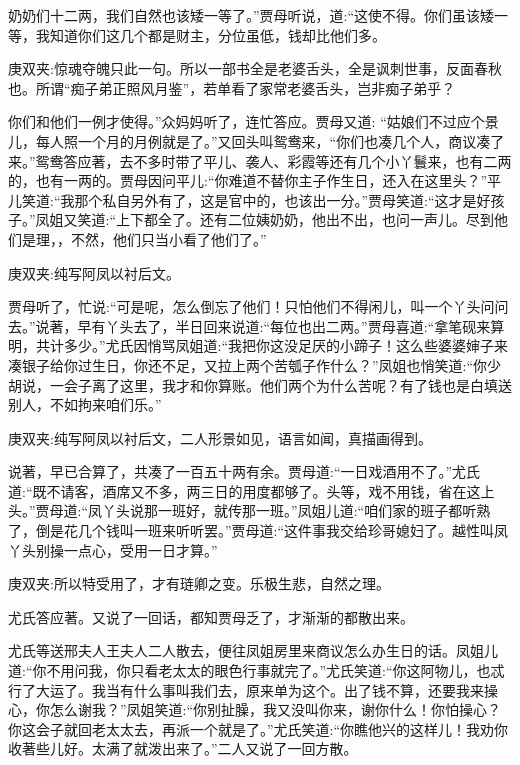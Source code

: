 \begin{parag}
奶奶们十二两，我们自然也该矮一等了。”贾母听说，道:“这使不得。你们虽该矮一等，我知道你们这几个都是财主，分位虽低，钱却比他们多。\begin{note}庚双夹:惊魂夺魄只此一句。所以一部书全是老婆舌头，全是讽刺世事，反面春秋也。所谓“痴子弟正照风月鉴”，若单看了家常老婆舌头，岂非痴子弟乎？\end{note}你们和他们一例才使得。”众妈妈听了，连忙答应。贾母又道: “姑娘们不过应个景儿，每人照一个月的月例就是了。”又回头叫鸳鸯来，“你们也凑几个人，商议凑了来。”鸳鸯答应著，去不多时带了平儿、袭人、彩霞等还有几个小丫鬟来，也有二两的，也有一两的。贾母因问平儿:“你难道不替你主子作生日，还入在这里头？”平儿笑道:“我那个私自另外有了，这是官中的，也该出一分。”贾母笑道:“这才是好孩子。”凤姐又笑道:“上下都全了。还有二位姨奶奶，他出不出，也问一声儿。尽到他们是理，，不然，他们只当小看了他们了。”\begin{note}庚双夹:纯写阿凤以衬后文。\end{note}贾母听了，忙说:“可是呢，怎么倒忘了他们！只怕他们不得闲儿，叫一个丫头问问去。”说著，早有丫头去了，半日回来说道:“每位也出二两。”贾母喜道:“拿笔砚来算明，共计多少。”尤氏因悄骂凤姐道:“我把你这没足厌的小蹄子！这么些婆婆婶子来凑银子给你过生日，你还不足，又拉上两个苦瓠子作什么？”凤姐也悄笑道:“你少胡说，一会子离了这里，我才和你算账。他们两个为什么苦呢？有了钱也是白填送别人，不如拘来咱们乐。”\begin{note}庚双夹:纯写阿凤以衬后文，二人形景如见，语言如闻，真描画得到。\end{note}
\end{parag}


\begin{parag}
    说著，早已合算了，共凑了一百五十两有余。贾母道:“一日戏酒用不了。”尤氏道:“既不请客，酒席又不多，两三日的用度都够了。头等，戏不用钱，省在这上头。”贾母道:“凤丫头说那一班好，就传那一班。”凤姐儿道:“咱们家的班子都听熟了，倒是花几个钱叫一班来听听罢。”贾母道:“这件事我交给珍哥媳妇了。越性叫凤丫头别操一点心，受用一日才算。”\begin{note}庚双夹:所以特受用了，才有琏卿之变。乐极生悲，自然之理。\end{note}尤氏答应著。又说了一回话，都知贾母乏了，才渐渐的都散出来。
\end{parag}


\begin{parag}
    尤氏等送邢夫人王夫人二人散去，便往凤姐房里来商议怎么办生日的话。凤姐儿道:“你不用问我，你只看老太太的眼色行事就完了。”尤氏笑道:“你这阿物儿，也忒行了大运了。我当有什么事叫我们去，原来单为这个。出了钱不算，还要我来操心，你怎么谢我？”凤姐笑道:“你别扯臊，我又没叫你来，谢你什么！你怕操心？你这会子就回老太太去，再派一个就是了。”尤氏笑道:“你瞧他兴的这样儿！我劝你收著些儿好。太满了就泼出来了。”二人又说了一回方散。
\end{parag}


